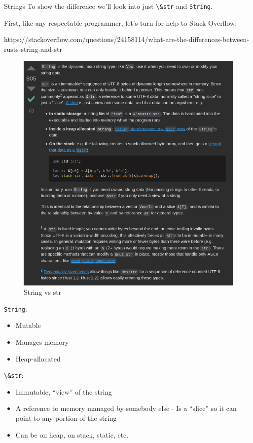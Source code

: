 \documentclass[
  9pt,
  ignorenonframetext,
]{beamer}
\newcommand{\passthrough}[1]{#1}
\providecommand{\tightlist}{%
  \setlength{\itemsep}{0pt}\setlength{\parskip}{0pt}}
\begin{document}
\begin{frame}[fragile]{Strings}
\protect\hypertarget{strings}{}
To show the difference we'll look into just
\passthrough{\lstinline!\&str!} and \passthrough{\lstinline!String!}.

First, like any respectable programmer, let's turn for help to Stack
Overflow:

https://stackoverflow.com/questions/24158114/what-are-the-differences-between-rusts-string-and-str

\begin{figure}
\centering
\includegraphics{img/string_str.png}
\caption{String vs str}
\end{figure}
\end{frame}

\begin{frame}[fragile]
\passthrough{\lstinline!String!}:

\begin{itemize}
\tightlist
\item
  Mutable
\item
  Manages memory
\item
  Heap-allocated
\end{itemize}

\passthrough{\lstinline!\&str!}:

\begin{itemize}
\tightlist
\item
  Immutable, ``view'' of the string
\item
  A reference to memory managed by somebody else - Is a ``slice'' so it
  can point to any portion of the string
\item
  Can be on heap, on stack, static, etc.
\end{itemize}
\end{frame}
\end{document}
